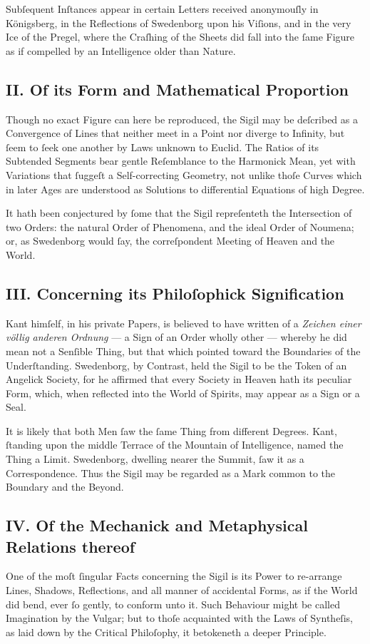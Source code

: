 \documentclass[12pt]{article}
\begin{document}
Subſequent Inſtances appear in certain Letters received anon­ymouſly in 
Königsberg, in the Reflections of Swedenborg upon his Viſions, and in the very 
Ice of the Pregel, where the Craſhing of the Sheets did fall into the ſame 
Figure as if compelled by an Intelligence older than Nature.

\subsection*{II. Of its Form and Mathematical Proportion}
Though no exact Figure can here be reproduced, the Sigil may be deſcribed as a 
Convergence of Lines that neither meet in a Point nor diverge to Infinity, but 
ſeem to ſeek one another by Laws unknown to Euclid. The Ratios of its 
Subtended Segments bear gentle Reſemblance to the Harmonick Mean, yet with 
Variations that ſuggeſt a Self-correcting Geometry, not unlike thoſe Curves 
which in later Ages are understood as Solutions to differential Equations of 
high Degree.

It hath been conjectured by ſome that the Sigil repreſenteth the Intersection 
of two Orders: the natural Order of Phenomena, and the ideal Order of 
Noumena; or, as Swedenborg would ſay, the correſpondent Meeting of Heaven and 
the World.

\subsection*{III. Concerning its Philoſophick Signification}
Kant himſelf, in his private Papers, is believed to have written of a 
\textit{Zeichen einer völlig anderen Ordnung} --- a Sign of an Order wholly 
other — whereby he did mean not a Senſible Thing, but that which pointed 
toward the Boundaries of the Underſtanding. Swedenborg, by Contrast, held the 
Sigil to be the Token of an Angelick Society, for he affirmed that every 
Society in Heaven hath its peculiar Form, which, when reflected into the World 
of Spirits, may appear as a Sign or a Seal.

It is likely that both Men ſaw the ſame Thing from different Degrees. Kant, 
ſtanding upon the middle Terrace of the Mountain of Intelligence, named the 
Thing a Limit. Swedenborg, dwelling nearer the Summit, ſaw it as a 
Correspondence. Thus the Sigil may be regarded as a Mark common to the 
Boundary and the Beyond.

\subsection*{IV. Of the Mechanick and Metaphysical Relations thereof}
One of the moſt ſingular Facts concerning the Sigil is its Power to re-arrange 
Lines, Shadows, Reflections, and all manner of accidental Forms, as if the 
World did bend, ever ſo gently, to conform unto it. Such Behaviour might be 
called Imagination by the Vulgar; but to thoſe acquainted with the Laws of 
Syntheſis, as laid down by the Critical Philoſophy, it betokeneth a deeper 
Principle.
\end{document}
